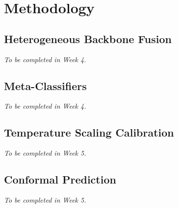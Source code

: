
\chapter{Methodology}\label{chap:methodology}


\section{Heterogeneous Backbone Fusion}\label{sec:fusion}
\textit{To be completed in Week 4.}

\section{Meta-Classifiers}\label{sec:meta_classifiers}
\textit{To be completed in Week 4.}

\section{Temperature Scaling Calibration}\label{sec:temp_scaling}
\textit{To be completed in Week 5.}

\section{Conformal Prediction}\label{sec:conformal}
\textit{To be completed in Week 5.}
